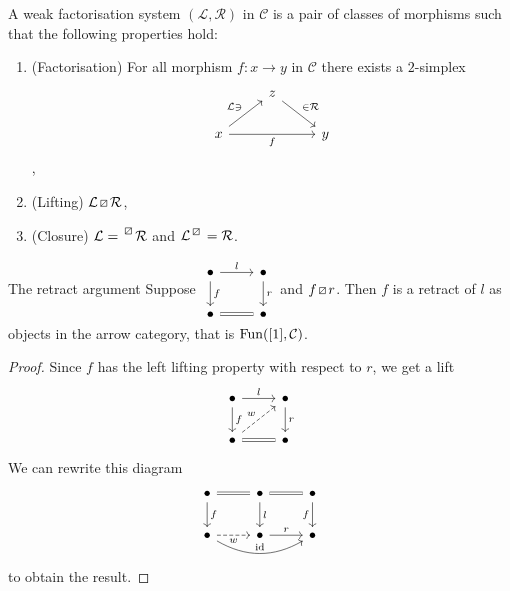 \begin{defi}
\label{weak factorisation system}
    A weak factorisation system $(\mathcal{L},\mathcal{R})$ in $\mathcal{C}$ is a pair of classes of morphisms such that the following properties hold:
    \begin{enumerate}
        \item 
        (Factorisation) For all morphism $f:x\to y$ in $\mathcal{C}$ there exists a $2$-simplex
        \[
        \begin{tikzcd}
            &
            z
            \ar[rd,"\in \mathcal{R}"]
            \\
            x
            \ar[ru, " \mathcal{L} \ni"]
            \ar[rr, "f"']
            &&
            y
        \end{tikzcd}
        \],
        \item 
        (Lifting) $\mathcal{L} \lift{} \mathcal{R}$,
        \item 
        (Closure) $\mathcal{L} = \prescript{\lift{}}{}{\mathcal{R}}$ and $\mathcal{L}^{\lift{}} = \mathcal{R}$.
    \end{enumerate}
\end{defi}

\begin{lem}{The retract argument}
Suppose 
$
\begin{tikzcd}
    \bullet
    \ar[d, "f"]
    \ar[r, "l"]
    &
    \bullet
    \ar[d, "r"]
    \\
    \bullet 
    \ar[r, equal]
    &
    \bullet
\end{tikzcd}
$
and $f \lift{} r$. Then $f$ is a retract of $l$ as objects in the arrow category, that is $\operatorname{Fun}([1], \mathcal{C})$.
\end{lem}

\begin{proof}
Since $f$ has the left lifting property with respect to $r$, we get a lift
\[
    \begin{tikzcd}
        \bullet
        \ar[d, "f"]
        \ar[r, "l"]
        &
        \bullet
        \ar[d, "r"]
        \\
        \bullet 
        \ar[ru, dashed, "w"]
        \ar[r, equal]
        &
        \bullet
    \end{tikzcd}
\]
We can rewrite this diagram
\[
    \begin{tikzcd}
        \bullet 
        \ar[r, equal]
        \ar[d, "f"]
        &
        \bullet
        \ar[r, equal]
        \ar[d, "l"]
        &
        \bullet
        \ar[d, "f"']
        \\
        \bullet
        \ar[rr, bend right, "\id"]
        \ar[r, dashed, "w"']
        &
        \bullet
        \ar[r, "r"]
        &
        \bullet
    \end{tikzcd}
\]
to obtain the result.
\end{proof}

